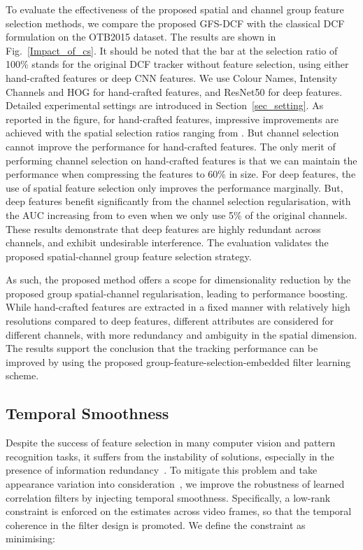 \documentclass[10pt,twocolumn,letterpaper]{article}
\begin{document}
To evaluate the effectiveness of the proposed spatial and channel group feature selection methods, we compare the proposed GFS-DCF with the classical DCF formulation on the OTB2015 dataset.
The results are shown in Fig.~\ref{Impact_of_cs}.
It should be noted that the bar at the selection ratio of 100\% stands for the original DCF tracker without feature selection, using either hand-crafted features or deep CNN features.
We use Colour Names, Intensity Channels and HOG for hand-crafted features, and ResNet50 for deep features.
Detailed experimental settings are introduced in Section~\ref{sec_setting}.
As reported in the figure, for hand-crafted features, impressive improvements are achieved with the spatial selection ratios ranging from .
But channel selection cannot improve the performance for hand-crafted features.
The only merit of performing channel selection on hand-crafted features is that we can maintain the performance when compressing the features to 60\% in size.
For deep features, the use of spatial feature selection only improves the performance marginally.
But, deep features benefit significantly from the channel selection regularisation, with the AUC increasing from  to  even when we only use 5\% of the original channels.
These results demonstrate that deep features are highly redundant across channels, and exhibit undesirable interference.
The evaluation validates the proposed spatial-channel group feature selection strategy.

As such, the proposed method offers a scope for dimensionality reduction by the proposed group spatial-channel regularisation, leading to performance boosting.
While hand-crafted features are extracted in a fixed manner with relatively high resolutions compared to deep features, different attributes are considered for different channels, with more redundancy and ambiguity in the spatial dimension.
The results support the conclusion that the tracking performance can be improved by using the proposed group-feature-selection-embedded filter learning scheme.


\subsection{Temporal Smoothness}
Despite the success of feature selection in many computer vision and pattern recognition tasks, it suffers from the instability of solutions, especially in the presence of information redundancy~\cite{meinshausen2010stability}. 
To mitigate this problem and take appearance variation into consideration~\cite{ross2008incremental}, we improve the robustness of learned correlation filters by injecting temporal smoothness. Specifically, a low-rank constraint is enforced on the estimates across video frames, so that the temporal coherence in the filter design is promoted.
We define the constraint as minimising:
\end{document}
